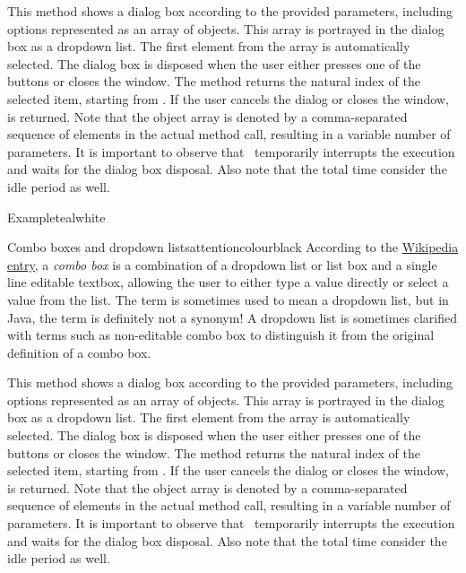 \begin{description}
This method shows a dialog box according to the provided parameters, including options represented as an array of  objects. This array is portrayed in the dialog box as a dropdown list. The first element from the array is automatically selected. The dialog box is disposed when the user either presses one of the buttons or closes the window. The method returns the natural index of the selected item, starting from . If the user cancels the dialog or closes the window,  is returned.  Note that the object array is denoted by a comma-separated sequence of elements in the actual method call, resulting in a variable number of parameters. It is important to observe that \arara\ temporarily interrupts the execution and waits for the dialog box disposal. Also note that the total time consider the idle period as well.

\begin{codebox}{Example}{teal}{\icnote}{white}
\end{codebox}

\begin{messagebox}{Combo boxes and dropdown lists}{attentioncolour}{\icattention}{black}
According to the \href{https://en.wikipedia.org/wiki/Combo_box}{Wikipedia entry}, a \emph{combo box} is a combination of a dropdown list or list box and a single line editable textbox, allowing the user to either type a value directly or select a value from the list. The term is sometimes used to mean a dropdown list, but in Java, the term is definitely not a synonym! A dropdown list is sometimes clarified with terms such as non-editable combo box to distinguish it from the original definition of a combo box.
\end{messagebox}

\item[\mddbox{C}{R}{\parbox{0.49\textwidth}{showDropdown(int icon, String title,\\\hspace*{1em} String text, Object... options)}}{int}]

This method shows a dialog box according to the provided parameters, including options represented as an array of  objects. This array is portrayed in the dialog box as a dropdown list. The first element from the array is automatically selected. The dialog box is disposed when the user either presses one of the buttons or closes the window. The method returns the natural index of the selected item, starting from . If the user cancels the dialog or closes the window,  is returned.  Note that the object array is denoted by a comma-separated sequence of elements in the actual method call, resulting in a variable number of parameters. It is important to observe that \arara\ temporarily interrupts the execution and waits for the dialog box disposal. Also note that the total time consider the idle period as well.


\end{description}
